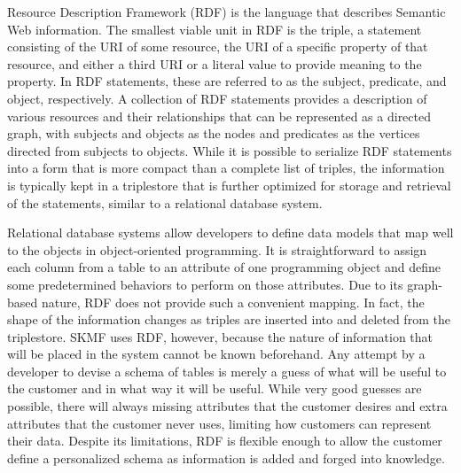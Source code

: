 Resource Description Framework (RDF) is the language that describes Semantic Web information. The smallest viable unit in RDF is the triple, a statement consisting of the URI of some resource, the URI of a specific property of that resource, and either a third URI or a literal value to provide meaning to the property. In RDF statements, these are referred to as the subject, predicate, and object, respectively. A collection of RDF statements provides a description of various resources and their relationships that can be represented as a directed graph, with subjects and objects as the nodes and predicates as the vertices directed from subjects to objects. While it is possible to serialize RDF statements into a form that is more compact than a complete list of triples, the information is typically kept in a triplestore that is further optimized for storage and retrieval of the statements, similar to a relational database system.

Relational database systems allow developers to define data models that map well to the objects in object-oriented programming. It is straightforward to assign each column from a table to an attribute of one programming object and define some predetermined behaviors to perform on those attributes. Due to its graph-based nature, RDF does not provide such a convenient mapping. In fact, the shape of the information changes as triples are inserted into and deleted from the triplestore. SKMF uses RDF, however, because the nature of information that will be placed in the system cannot be known beforehand. Any attempt by a developer to devise a schema of tables is merely a guess of what will be useful to the customer and in what way it will be useful. While very good guesses are possible, there will always missing attributes that the customer desires and extra attributes that the customer never uses, limiting how customers can represent their data. Despite its limitations, RDF is flexible enough to allow the customer define a personalized schema as information is added and forged into knowledge.


%
